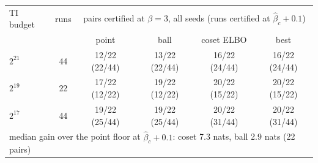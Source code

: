 \begin{tabular}{lccccc}
\toprule
TI budget & runs & \multicolumn{4}{c}{pairs certified at $\beta{=}3$, all seeds (runs certified at $\hat\beta_c{+}0.1$)} \\
 & & point & ball & coset ELBO & best \\
\midrule
$2^{21}$ & 44 & 12/22 (22/44) & 13/22 (22/44) & 16/22 (24/44) & 16/22 (24/44) \\
$2^{19}$ & 22 & 17/22 (12/22) & 19/22 (12/22) & 20/22 (15/22) & 20/22 (15/22) \\
$2^{17}$ & 44 & 19/22 (25/44) & 19/22 (25/44) & 20/22 (31/44) & 20/22 (31/44) \\
\midrule
\multicolumn{6}{l}{median gain over the point floor at $\hat\beta_c{+}0.1$: coset 7.3 nats, ball 2.9 nats (22 pairs)} \\
\bottomrule
\end{tabular}

